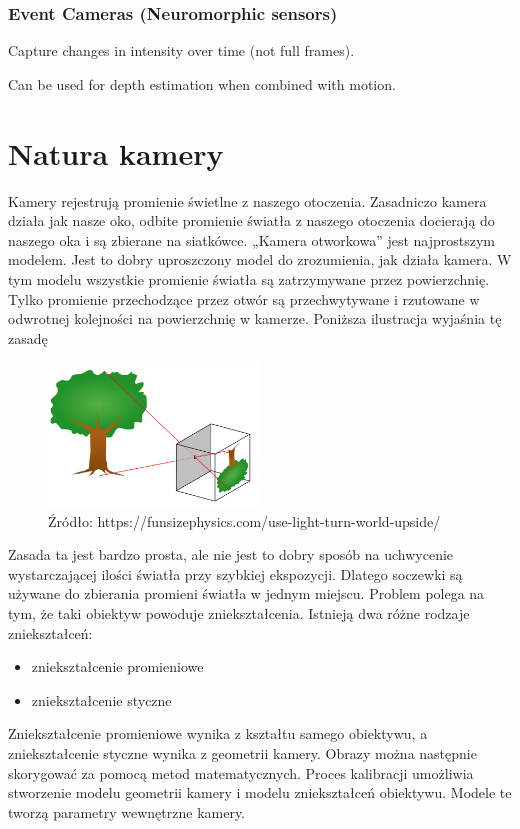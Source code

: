 \documentclass[magisterska]{pracadypl}
\begin{document}
\subsubsection{Event Cameras (Neuromorphic sensors)}
Capture changes in intensity over time (not full frames).

Can be used for depth estimation when combined with motion.

\section{Natura kamery}

Kamery rejestrują promienie świetlne z naszego otoczenia. Zasadniczo kamera działa jak
nasze oko, odbite promienie światła z naszego otoczenia docierają do naszego oka i są zbierane na siatkówce.
„Kamera otworkowa” jest najprostszym modelem. Jest to dobry uproszczony model do zrozumienia, jak działa kamera. W tym modelu wszystkie promienie światła są zatrzymywane przez powierzchnię. Tylko promienie przechodzące przez otwór są przechwytywane i rzutowane w odwrotnej kolejności na powierzchnię w kamerze. Poniższa ilustracja wyjaśnia tę zasadę

\begin{figure}[h]  %
    \centering  %
    \includegraphics[width=0.5\textwidth]{images/light.png}  %
    \captionsetup{labelformat=empty, font=footnotesize}
    \caption{Źródło: https://funsizephysics.com/use-light-turn-world-upside/}
    \label{fig:rpi}  %
\end{figure}

Zasada ta jest bardzo prosta, ale nie jest to dobry sposób na uchwycenie wystarczającej ilości światła przy szybkiej ekspozycji.
Dlatego soczewki są używane do zbierania promieni światła w jednym miejscu. Problem polega na tym, że taki obiektyw powoduje zniekształcenia.
Istnieją dwa różne rodzaje zniekształceń:
\begin{itemize}
  \item zniekształcenie promieniowe
  \item zniekształcenie styczne
\end{itemize}
Zniekształcenie promieniowe wynika z kształtu samego obiektywu, a zniekształcenie styczne
wynika z geometrii kamery. Obrazy można następnie skorygować za pomocą metod matematycznych.
Proces kalibracji umożliwia stworzenie modelu geometrii kamery i modelu zniekształceń obiektywu.
Modele te tworzą parametry wewnętrzne kamery.
\end{document}
